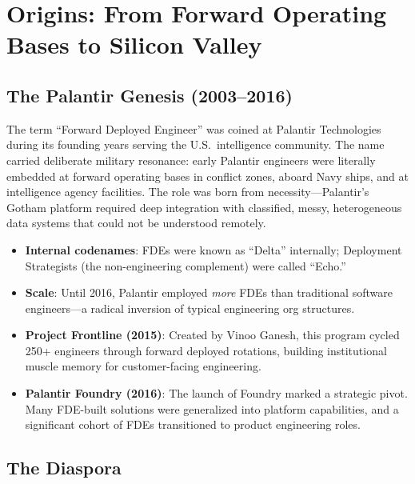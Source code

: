 \section{Origins: From Forward Operating Bases to Silicon Valley}

\subsection{The Palantir Genesis (2003--2016)}

The term ``Forward Deployed Engineer'' was coined at Palantir Technologies
during its founding years serving the U.S.\ intelligence community. The
name carried deliberate military resonance: early Palantir engineers were
literally embedded at forward operating bases in conflict zones, aboard
Navy ships, and at intelligence agency facilities. The role was born from
necessity---Palantir's Gotham platform required deep integration with
classified, messy, heterogeneous data systems that could not be understood
remotely.

\begin{itemize}
    \item \textbf{Internal codenames}: FDEs were known as ``Delta''
        internally; Deployment Strategists (the non-engineering
        complement) were called ``Echo.''
    \item \textbf{Scale}: Until 2016, Palantir employed \textit{more}
        FDEs than traditional software engineers---a radical inversion of
        typical engineering org structures.
    \item \textbf{Project Frontline (2015)}: Created by Vinoo Ganesh,
        this program cycled 250+ engineers through forward deployed
        rotations, building institutional muscle memory for
        customer-facing engineering.
    \item \textbf{Palantir Foundry (2016)}: The launch of Foundry marked
        a strategic pivot. Many FDE-built solutions were generalized into
        platform capabilities, and a significant cohort of FDEs
        transitioned to product engineering roles.
\end{itemize}

\subsection{The Diaspora}

